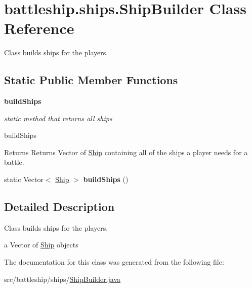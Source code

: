 \hypertarget{classbattleship_1_1ships_1_1ShipBuilder}{}\section{battleship.\+ships.\+Ship\+Builder Class Reference}
\label{classbattleship_1_1ships_1_1ShipBuilder}


Class builds ships for the players.  


\subsection*{Static Public Member Functions}
\begin{Indent}{\bf build\+Ships}\par
{\em static method that returns all ships

build\+Ships

\begin{DoxyReturn}{Returns}
Returns Vector of \hyperlink{classbattleship_1_1ships_1_1Ship}{Ship} containing all of the ships a player needs for a battle. 
\end{DoxyReturn}
}\begin{DoxyCompactItemize}
\item 
\hypertarget{classbattleship_1_1ships_1_1ShipBuilder_a4bd042209284026196c44d5a02698a98}{}static Vector$<$ \hyperlink{classbattleship_1_1ships_1_1Ship}{Ship} $>$ {\bfseries build\+Ships} ()\label{classbattleship_1_1ships_1_1ShipBuilder_a4bd042209284026196c44d5a02698a98}

\end{DoxyCompactItemize}
\end{Indent}


\subsection{Detailed Description}
Class builds ships for the players. 

a Vector of \hyperlink{classbattleship_1_1ships_1_1Ship}{Ship} objects 

The documentation for this class was generated from the following file\+:\begin{DoxyCompactItemize}
\item 
src/battleship/ships/\hyperlink{ShipBuilder_8java}{Ship\+Builder.\+java}\end{DoxyCompactItemize}
